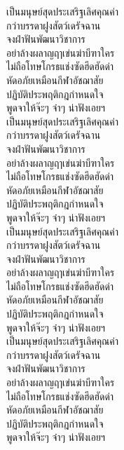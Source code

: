 \documentclass[twocolumn,a4paper]{article}
\begin{document}
เป็นมนุษย์สุดประเสริฐเลิศคุณค่า\\
กว่าบรรดาฝูงสัตว์เดรัจฉาน \\
จงฝ่าฟันพัฒนาวิชาการ \\
อย่าล้างผลาญฤๅเข่นฆ่าบีฑาใคร\\ 
ไม่ถือโทษโกรธแช่งซัดฮึดฮัดด่า \\
หัดอภัยเหมือนกีฬาอัชฌาสัย \\
ปฏิบัติประพฤติกฎกำหนดใจ \\
พูดจาให้จ๊ะๆ จ๋าๆ น่าฟังเอยฯ\\ 

เป็นมนุษย์สุดประเสริฐเลิศคุณค่า\\
กว่าบรรดาฝูงสัตว์เดรัจฉาน \\
จงฝ่าฟันพัฒนาวิชาการ \\
อย่าล้างผลาญฤๅเข่นฆ่าบีฑาใคร\\ 
ไม่ถือโทษโกรธแช่งซัดฮึดฮัดด่า \\
หัดอภัยเหมือนกีฬาอัชฌาสัย \\
ปฏิบัติประพฤติกฎกำหนดใจ \\
พูดจาให้จ๊ะๆ จ๋าๆ น่าฟังเอยฯ\\ 

เป็นมนุษย์สุดประเสริฐเลิศคุณค่า\\
กว่าบรรดาฝูงสัตว์เดรัจฉาน \\
จงฝ่าฟันพัฒนาวิชาการ \\
อย่าล้างผลาญฤๅเข่นฆ่าบีฑาใคร\\ 
ไม่ถือโทษโกรธแช่งซัดฮึดฮัดด่า \\
หัดอภัยเหมือนกีฬาอัชฌาสัย \\
ปฏิบัติประพฤติกฎกำหนดใจ \\
พูดจาให้จ๊ะๆ จ๋าๆ น่าฟังเอยฯ\\ 

เป็นมนุษย์สุดประเสริฐเลิศคุณค่า\\
กว่าบรรดาฝูงสัตว์เดรัจฉาน \\
จงฝ่าฟันพัฒนาวิชาการ \\
อย่าล้างผลาญฤๅเข่นฆ่าบีฑาใคร\\ 
ไม่ถือโทษโกรธแช่งซัดฮึดฮัดด่า \\
หัดอภัยเหมือนกีฬาอัชฌาสัย \\
ปฏิบัติประพฤติกฎกำหนดใจ \\
พูดจาให้จ๊ะๆ จ๋าๆ น่าฟังเอยฯ\\ 
\end{document}
